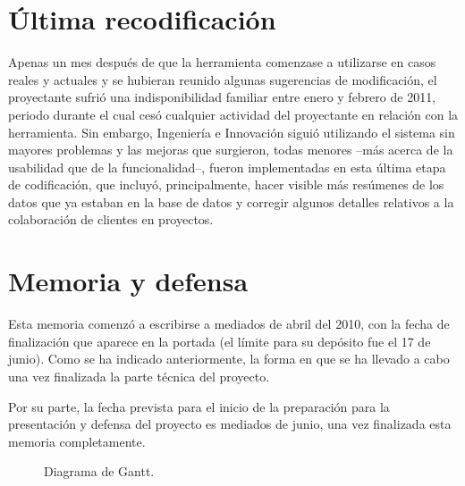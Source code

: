 \section{Última recodificación}

Apenas un mes después de que la herramienta comenzase a utilizarse en casos
reales y actuales y se hubieran reunido algunas sugerencias de modificación,
el proyectante sufrió una indisponibilidad familiar entre enero y febrero de
2011, periodo durante el cual cesó cualquier actividad del proyectante en
relación con la herramienta. Sin embargo, Ingeniería e Innovación siguió
utilizando el sistema sin mayores problemas y las mejoras que surgieron, todas
menores --más acerca de la usabilidad que de la funcionalidad--, fueron
implementadas en esta última etapa de codificación, que incluyó,
principalmente, hacer visible más resúmenes de los datos que ya estaban en la
base de datos y corregir algunos detalles relativos a la colaboración de
clientes en proyectos.

\section{Memoria y defensa}

Esta memoria comenzó a escribirse a mediados de abril del 2010, con la fecha de
finalización que aparece en la portada (el límite para su depósito fue el 17 de
junio). Como se ha indicado anteriormente, la forma en que se ha llevado a cabo
una vez finalizada la parte técnica del proyecto.

Por su parte, la fecha prevista para el inicio de la preparación para la
presentación y defensa del proyecto es mediados de junio, una vez finalizada
esta memoria completamente.

\begin{figure}[h]
\centering
{}
\caption{Diagrama de Gantt.}
\label{fig:gantt}
\end{figure}

%
%


